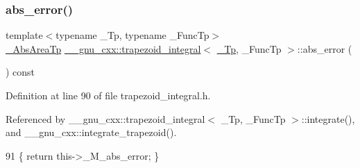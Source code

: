 \subsubsection{\texorpdfstring{abs\+\_\+error()}{abs\_error()}}
{\footnotesize\ttfamily template$<$typename \+\_\+\+Tp, typename \+\_\+\+Func\+Tp$>$ \\
\hyperlink{class____gnu__cxx_1_1trapezoid__integral_a14ad7fdce0a3abc725d8d07adb5d340e}{\+\_\+\+Abs\+Area\+Tp} \hyperlink{class____gnu__cxx_1_1trapezoid__integral}{\+\_\+\+\_\+gnu\+\_\+cxx\+::trapezoid\+\_\+integral}$<$ \hyperlink{namespace____gnu__cxx_a3b19a9c800ca194374ef9172290f7d79}{\+\_\+\+Tp}, \+\_\+\+Func\+Tp $>$\+::abs\+\_\+error (\begin{DoxyParamCaption}{ }\end{DoxyParamCaption}) const\hspace{0.3cm}{\ttfamily [inline]}}



Definition at line 90 of file trapezoid\+\_\+integral.\+h.



Referenced by \+\_\+\+\_\+gnu\+\_\+cxx\+::trapezoid\+\_\+integral$<$ \+\_\+\+Tp, \+\_\+\+Func\+Tp $>$\+::integrate(), and \+\_\+\+\_\+gnu\+\_\+cxx\+::integrate\+\_\+trapezoid().


\begin{DoxyCode}
91       \{ \textcolor{keywordflow}{return} this->\_M\_abs\_error; \}
\end{DoxyCode}
\mbox{\label{class____gnu__cxx_1_1trapezoid__integral_a11b2aa6156935929b6221be677c6f10f}} 
